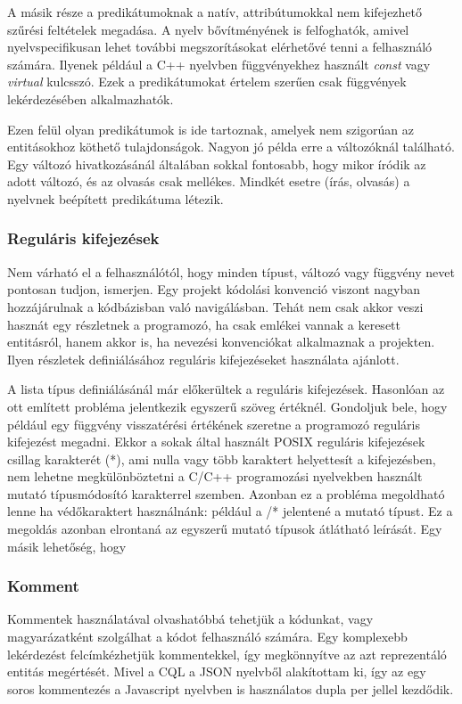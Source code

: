 \documentclass[a4paper,12pt]{report}
\begin{document}
\par A másik része a predikátumoknak a natív, attribútumokkal nem kifejezhető szűrési feltételek megadása. A nyelv bővítményének is felfoghatók, amivel nyelvspecifikusan lehet további megszorításokat elérhetővé tenni a felhasználó számára. Ilyenek például a C++ nyelvben függvényekhez használt \textit{const} vagy \textit{virtual} kulcsszó. Ezek a predikátumokat értelem szerűen csak függvények lekérdezésében alkalmazhatók.
\par Ezen felül olyan predikátumok is ide tartoznak, amelyek nem szigorúan az entitásokhoz köthető tulajdonságok. Nagyon jó példa erre a változóknál található. Egy változó hivatkozásánál általában sokkal fontosabb, hogy mikor íródik az adott változó, és az olvasás csak mellékes. Mindkét esetre (írás, olvasás) a nyelvnek beépített predikátuma létezik.
\subsubsection{Reguláris kifejezések}
Nem várható el a felhasználótól, hogy minden típust, változó vagy függvény nevet pontosan tudjon, ismerjen. Egy projekt kódolási konvenció viszont nagyban hozzájárulnak a kódbázisban való navigálásban. Tehát nem csak akkor veszi hasznát egy részletnek a programozó, ha csak emlékei vannak a keresett entitásról, hanem akkor is, ha nevezési konvenciókat alkalmaznak a projekten. Ilyen részletek definiálásához reguláris kifejezéseket használata ajánlott.
\par A lista típus definiálásánál már előkerültek a reguláris kifejezések. Hasonlóan az ott említett probléma jelentkezik egyszerű szöveg értéknél. Gondoljuk bele, hogy például egy függvény visszatérési értékének szeretne a programozó reguláris kifejezést megadni. Ekkor a sokak által használt POSIX reguláris kifejezések \cite{posix} csillag karakterét (*), ami nulla vagy több karaktert helyettesít a kifejezésben, nem lehetne megkülönböztetni a C/C++ programozási nyelvekben használt mutató típusmódosító karakterrel szemben. Azonban ez a probléma megoldható lenne ha védőkaraktert használnánk: például a /* jelentené a mutató típust. Ez a megoldás azonban elrontaná az egyszerű mutató típusok átlátható leírását. Egy másik lehetőség, hogy 
\subsubsection{Komment}
Kommentek használatával olvashatóbbá tehetjük a kódunkat, vagy magyarázatként szolgálhat a kódot felhasználó számára. Egy komplexebb lekérdezést felcímkézhetjük kommentekkel, így megkönnyítve az azt reprezentáló entitás megértését. Mivel a CQL a JSON nyelvből alakítottam ki, így az egy soros kommentezés a Javascript nyelvben is használatos dupla per jellel kezdődik.
\end{document}
